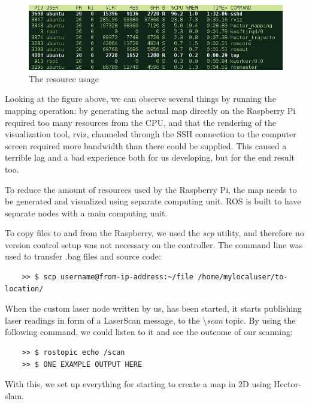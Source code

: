 \begin{figure}[H]
	\centering
	\includegraphics[width=.8\linewidth]{images/rvisScreenshotCropped.jpg}
	\caption{The resource usage}
\end{figure}

Looking at the figure above, we can observe several things by running the mapping operation: by generating the actual map directly on the Raspberry Pi required too many resources from the CPU, and that the rendering of the visualization tool, rviz, channeled through the SSH connection to the computer screen required more bandwidth than there could be supplied. This caused a terrible lag and a bad experience both for us developing, but for the end result too.

To reduce the amount of resources used by the Raspberry Pi, the map needs to be generated and visualized using separate computing unit. ROS is built to have separate nodes with a main computing unit.

To copy files to and from the Raspberry, we used the \textit{scp} utility, and therefore no version control setup was not necessary on the controller. The command line was used to transfer .bag files and source code:
\begin{lstlisting}
	>> $ scp username@from-ip-address:~/file /home/mylocaluser/to-location/
\end{lstlisting}

When the custom laser node written by us, has been started, it starts publishing laser readings in form of a LaserScan message, to the \textbackslash\textit{scan} topic. By using the following command, we could listen to it and see the outcome of our scanning:

\begin{lstlisting}
	>> $ rostopic echo /scan
	>> $ ONE EXAMPLE OUTPUT HERE
\end{lstlisting}

With this, we set up everything for starting to create a map in 2D using Hector-slam.